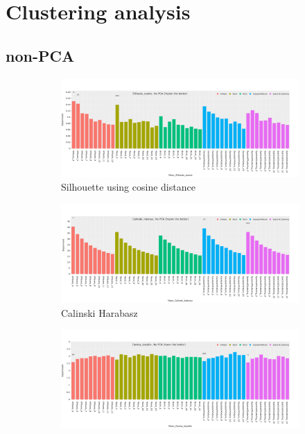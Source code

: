 \chapter{Clustering analysis} \label{s:ap:cs}


\section{non-PCA} \label{s:ap:non-pca}


\begin{figure}[!h]
    \captionsetup[subfigure]{justification=Centering}
    \centering
    \begin{subfigure}[!t]{0.6\textwidth}
        \includegraphics[width=\textwidth]{Sections/ClusteringAnalysis/Resources/cs_top3/nonPCA/non_PCA_top3_Silhoute_cosine.png}
        \caption{Silhouette using cosine distance}
        \label{fig:ap:cosine}
    \end{subfigure}
    \centering
    \begin{subfigure}[!t]{0.6\textwidth}
        \includegraphics[width=\textwidth]{Sections/ClusteringAnalysis/Resources/cs_top3/nonPCA/non_PCA_top3_Calinski_habrasz.png}
        \caption{Calinski Harabasz}
        \label{fig:ap:cal_hab}
    \end{subfigure}
    \centering
    \begin{subfigure}[!t]{0.6\textwidth}
        \includegraphics[width=\textwidth]{Sections/ClusteringAnalysis/Resources/cs_top3/nonPCA/non_PCA_top3_Davies_bouldin.png}

\end{subfigure}
\end{figure}
